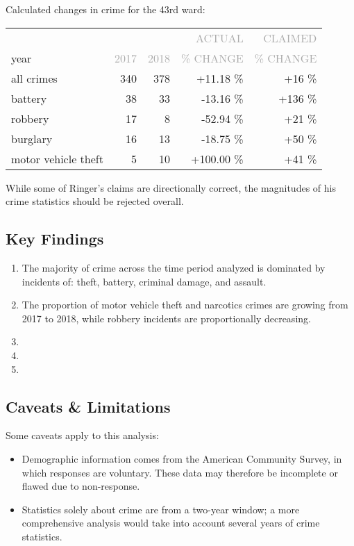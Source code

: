 \documentclass[11pt]{article}
\newcommand{\printsubsection}[1]{\normalfont\headerfontlt\textcolor{darkgray}{{#1}}}
\newcommand{\opns}[1]{\textrm{\small\printsubsection{\MakeUppercase{#1}}}}
\begin{document}
Calculated changes in crime for the 43rd ward:
\begin{table}[H]
\centering \renewcommand{\arraystretch}{1.2}
\begin{tabular}{lrrrr}
\multicolumn{1}{l|}{} & & & \opns{ACTUAL} & \opns{CLAIMED} \\
\multicolumn{1}{l|}{year} &    \opns{2017} &    \opns{2018} &     \opns{\% CHANGE} &     \opns{\% CHANGE} \\\hline
\multicolumn{1}{l|}{all crimes}          &  340  &  378   &  +11.18 \% & +16  \% \\
\multicolumn{1}{l|}{battery}             &    38 &    33  & -13.16  \% & +136 \% \\
\multicolumn{1}{l|}{robbery}             &    17 &     8  & -52.94  \% & +21  \% \\
\multicolumn{1}{l|}{burglary}            &    16 &    13  & -18.75  \% & +50  \% \\
\multicolumn{1}{l|}{motor vehicle theft} &     5 &    10  & +100.00 \% & +41  \% \\
\end{tabular}
\end{table}
While some of Ringer's claims are directionally correct, the magnitudes of his crime statistics should be rejected overall.

\subsection{Key Findings}
\begin{enumerate}
\item The majority of crime across the time period analyzed is dominated by incidents of: theft, battery, criminal damage, and assault. 
\item The proportion of motor vehicle theft and narcotics crimes are growing from 2017 to 2018, while robbery incidents are proportionally decreasing.
\item 
\item 
\item 
\end{enumerate}
\subsection{Caveats \& Limitations}
Some caveats apply to this analysis:
\begin{itemize}
\item Demographic information comes from the American Community Survey, in which responses are voluntary. These data may therefore be incomplete or flawed due to non-response.
\item Statistics solely about crime are from a two-year window; a more comprehensive analysis would take into account several years of crime statistics.
\end{itemize}
\pagebreak
\end{document}
